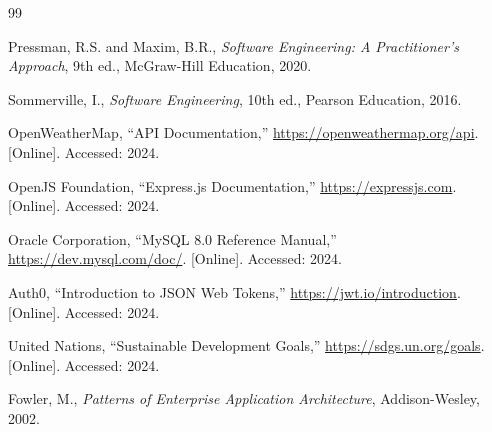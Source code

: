 \begin{thebibliography}{99}

Pressman, R.S. and Maxim, B.R., \textit{Software Engineering: A Practitioner's Approach}, 9th ed., McGraw-Hill Education, 2020.

Sommerville, I., \textit{Software Engineering}, 10th ed., Pearson Education, 2016.

OpenWeatherMap, ``API Documentation,'' \url{https://openweathermap.org/api}. [Online]. Accessed: 2024.

OpenJS Foundation, ``Express.js Documentation,'' \url{https://expressjs.com}. [Online]. Accessed: 2024.

Oracle Corporation, ``MySQL 8.0 Reference Manual,'' \url{https://dev.mysql.com/doc/}. [Online]. Accessed: 2024.

Auth0, ``Introduction to JSON Web Tokens,'' \url{https://jwt.io/introduction}. [Online]. Accessed: 2024.

United Nations, ``Sustainable Development Goals,'' \url{https://sdgs.un.org/goals}. [Online]. Accessed: 2024.

Fowler, M., \textit{Patterns of Enterprise Application Architecture}, Addison-Wesley, 2002.

\end{thebibliography}
